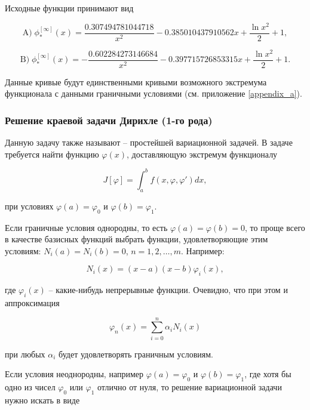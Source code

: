 \documentclass{article}
\begin{document}
\noindent Исходные функции принимают вид

\begin{displaymath}
	\text{A)} \; \phi_{\ast}^{[\infty]}(x) = \frac{0.307494781044718}{x^2} - 0.385010437910562 x + \frac{\ln{x^2}}{2} + 1,
\end{displaymath}

\begin{displaymath}
	\text{B)} \; \phi_{\ast}^{[\infty]}(x) = - \frac{0.602284273146684}{x^2} - 0.397715726853315 x + \frac{\ln{x^2}}{2} + 1.
\end{displaymath}

Данные кривые будут единственными кривыми возможного экстремума функционала с данными граничными условиями (см. приложение \ref{appendix_a}). 

\subsubsection{Решение краевой задачи Дирихле (1-го рода)}

Данную задачу также называют – простейшей вариационной задачей. В задаче требуется найти функцию $\varphi(x)$, доставляющую экстремум функционалу

\begin{displaymath}
	J[\varphi] = \int_{a}^{b} f(x, \varphi, \varphi')dx,
\end{displaymath}

\noindent при условиях $\varphi(a) = \varphi_{0}$ и $\varphi(b) = \varphi_{1}$.

Если граничные условия однородны, то есть $\varphi(a) = \varphi(b) = 0$, то проще всего в качестве базисных функций выбрать функции, удовлетворяющие этим условиям: $N_{i}(a) = N_{i}(b) = 0$, $n = 1, 2, \ldots, m$. Например:

\begin{displaymath}
	N_{i}(x) = (x-a)(x-b)\varphi_{i}(x),
\end{displaymath}

\noindent где $\varphi_{i}(x)$ – какие-нибудь непрерывные функции. Очевидно, что при этом и аппроксимация 

\begin{displaymath}
	\varphi_{n}(x) = \sum_{i=0}^n \alpha_{i}N_{i}(x)
\end{displaymath}

\noindent при любых $\alpha_{i}$ будет удовлетворять граничным условиям.

Если условия неоднородны, например $\varphi(a) = \varphi_{0}$ и $\varphi(b) = \varphi_{1}$, где хотя бы одно из чисел $\varphi_{0}$ или $\varphi_{1}$ отлично от нуля, то решение вариационной задачи нужно искать в виде
\end{document}

